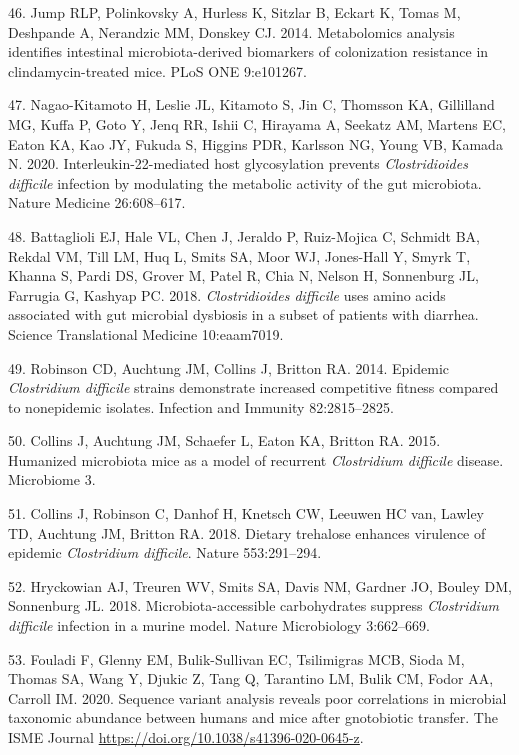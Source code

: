 \documentclass[
  11pt,
]{article}
\begin{document}
\leavevmode\hypertarget{ref-Jump2014}{}%
46. Jump RLP, Polinkovsky A, Hurless K, Sitzlar B, Eckart K, Tomas M,
Deshpande A, Nerandzic MM, Donskey CJ. 2014. Metabolomics analysis
identifies intestinal microbiota-derived biomarkers of colonization
resistance in clindamycin-treated mice. PLoS ONE 9:e101267.

\leavevmode\hypertarget{ref-NagaoKitamoto2020}{}%
47. Nagao-Kitamoto H, Leslie JL, Kitamoto S, Jin C, Thomsson KA,
Gillilland MG, Kuffa P, Goto Y, Jenq RR, Ishii C, Hirayama A, Seekatz
AM, Martens EC, Eaton KA, Kao JY, Fukuda S, Higgins PDR, Karlsson NG,
Young VB, Kamada N. 2020. Interleukin-22-mediated host glycosylation
prevents \emph{Clostridioides difficile} infection by modulating the
metabolic activity of the gut microbiota. Nature Medicine 26:608--617.

\leavevmode\hypertarget{ref-Battaglioli2018}{}%
48. Battaglioli EJ, Hale VL, Chen J, Jeraldo P, Ruiz-Mojica C, Schmidt
BA, Rekdal VM, Till LM, Huq L, Smits SA, Moor WJ, Jones-Hall Y, Smyrk T,
Khanna S, Pardi DS, Grover M, Patel R, Chia N, Nelson H, Sonnenburg JL,
Farrugia G, Kashyap PC. 2018. \emph{Clostridioides difficile} uses amino
acids associated with gut microbial dysbiosis in a subset of patients
with diarrhea. Science Translational Medicine 10:eaam7019.

\leavevmode\hypertarget{ref-Robinson2014}{}%
49. Robinson CD, Auchtung JM, Collins J, Britton RA. 2014. Epidemic
\emph{Clostridium difficile} strains demonstrate increased competitive
fitness compared to nonepidemic isolates. Infection and Immunity
82:2815--2825.

\leavevmode\hypertarget{ref-Collins2015}{}%
50. Collins J, Auchtung JM, Schaefer L, Eaton KA, Britton RA. 2015.
Humanized microbiota mice as a model of recurrent \emph{Clostridium
difficile} disease. Microbiome 3.

\leavevmode\hypertarget{ref-Collins2018}{}%
51. Collins J, Robinson C, Danhof H, Knetsch CW, Leeuwen HC van, Lawley
TD, Auchtung JM, Britton RA. 2018. Dietary trehalose enhances virulence
of epidemic \emph{Clostridium difficile}. Nature 553:291--294.

\leavevmode\hypertarget{ref-Hryckowian2018}{}%
52. Hryckowian AJ, Treuren WV, Smits SA, Davis NM, Gardner JO, Bouley
DM, Sonnenburg JL. 2018. Microbiota-accessible carbohydrates suppress
\emph{Clostridium difficile} infection in a murine model. Nature
Microbiology 3:662--669.

\leavevmode\hypertarget{ref-Fouladi2020}{}%
53. Fouladi F, Glenny EM, Bulik-Sullivan EC, Tsilimigras MCB, Sioda M,
Thomas SA, Wang Y, Djukic Z, Tang Q, Tarantino LM, Bulik CM, Fodor AA,
Carroll IM. 2020. Sequence variant analysis reveals poor correlations in
microbial taxonomic abundance between humans and mice after gnotobiotic
transfer. The ISME Journal
\url{https://doi.org/10.1038/s41396-020-0645-z}.
\end{document}
